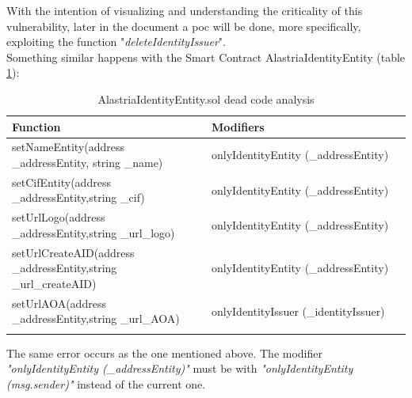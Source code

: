 \documentclass[a4paper, 12pt]{article} %
\begin{document}
            With the intention of visualizing and understanding the criticality of this vulnerability, later in the document a \acrfull{poc} will be done, more specifically, exploiting the function "\textit{deleteIdentityIssuer}".\\
            
            Something similar happens with the Smart Contract AlastriaIdentityEntity (table \ref{tab:dead-code-entity}):
            \newpage
            \begin{longtable}{||p{0.5\linewidth} | p{0.5\linewidth}||}
                \hline
                \textbf{Function}  & \textbf{Modifiers}\\ [0.5ex] 
                \hline\hline
                setNameEntity\newline (address \_addressEntity, string \_name) & onlyIdentityEntity (\_addressEntity)\\
                \hline
                setCifEntity\newline (address \_addressEntity,\newline string \_cif) & onlyIdentityEntity (\_addressEntity)\\
                \hline
                setUrlLogo\newline (address \_addressEntity,\newline string \_url\_logo) & onlyIdentityEntity (\_addressEntity)\\
                \hline
                setUrlCreateAID\newline (address \_addressEntity,\newline string \_url\_createAID) & onlyIdentityEntity (\_addressEntity)\\
                \hline
                setUrlAOA\newline (address \_addressEntity,\newline string \_url\_AOA)  & onlyIdentityIssuer (\_identityIssuer)\\[1ex] 
                \hline
                \caption{AlastriaIdentityEntity.sol dead code analysis}
                \label{tab:dead-code-entity}
            \end{longtable}
            The same error occurs as the one mentioned above. The modifier \textit{"onlyIdentityEntity (\_addressEntity)"} must be with \textit{"onlyIdentityEntity (msg.sender)"} instead of the current one.\\
            
\end{document}
